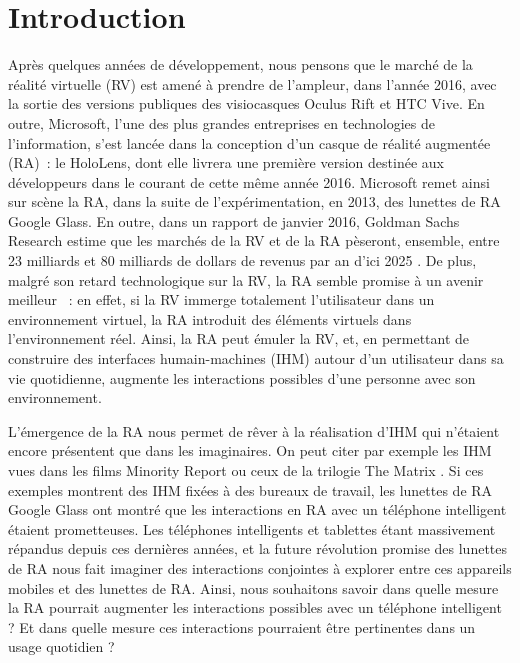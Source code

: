 \section*{Introduction}
Après quelques années de développement, nous pensons que le marché de la réalité virtuelle (RV) est amené à prendre de l'ampleur, dans l'année 2016, avec la sortie des versions publiques des visiocasques Oculus Rift et HTC Vive. En outre, Microsoft, l'une des plus grandes entreprises en technologies de l'information, s'est lancée dans la conception d'un casque de réalité augmentée (RA)~: le HoloLens, dont elle livrera une première version destinée aux développeurs dans le courant de cette même année 2016. Microsoft remet ainsi sur scène la RA, dans la suite de l'expérimentation, en 2013, des lunettes de RA Google Glass. En outre, dans un rapport de janvier 2016, Goldman Sachs Research estime que les marchés de la RV et de la RA pèseront, ensemble, entre 23 milliards et 80 milliards de dollars de revenus par an d'ici 2025 \citep{BelliniChenSugiyamaEtAl2016}. De plus, malgré son retard technologique sur la RV, la RA semble promise à un avenir meilleur \citep{BelliniChenSugiyamaEtAl2016}~: en effet, si la RV immerge totalement l'utilisateur dans un environnement virtuel, la RA introduit des éléments virtuels dans l'environnement réel. Ainsi, la RA peut émuler la RV, et, en permettant de construire des interfaces humain-machines (IHM) autour d'un utilisateur dans sa vie quotidienne, augmente les interactions possibles d'une personne avec son environnement.

L'émergence de la RA nous permet de rêver à la réalisation d'IHM qui n'étaient encore présentent que dans les imaginaires. On peut citer par exemple les IHM vues dans les films Minority Report  ou ceux de la trilogie The Matrix . Si ces exemples montrent des IHM fixées à des bureaux de travail, les lunettes de RA Google Glass ont montré que les interactions en RA avec un téléphone intelligent étaient prometteuses. Les téléphones intelligents et tablettes étant massivement répandus depuis ces dernières années, et la future révolution promise des lunettes de RA nous fait imaginer des interactions conjointes à explorer entre ces appareils mobiles et des lunettes de RA. Ainsi, nous souhaitons savoir dans quelle mesure la RA pourrait augmenter les interactions possibles avec un téléphone intelligent ? Et dans quelle mesure ces interactions pourraient être pertinentes dans un usage quotidien ?

